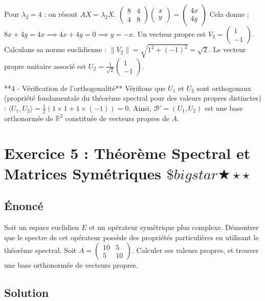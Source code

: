 \documentclass[11pt,a4paper]{article}
\begin{document}
Pour $\lambda_2 = 4$ : on résout $AX = \lambda_2 X$.
$\begin{pmatrix} 8 & 4 \\ 4 & 8 \end{pmatrix} \begin{pmatrix} x \\ y \end{pmatrix} = \begin{pmatrix} 4x \\ 4y \end{pmatrix}$
Cela donne :
$8x + 4y = 4x \implies 4x + 4y = 0 \implies y = -x$.
Un vecteur propre est $V_2 = \begin{pmatrix} 1 \\ -1 \end{pmatrix}$.
Calculons sa norme euclidienne : $\|V_2\| = \sqrt{1^2 + (-1)^2} = \sqrt{2}$.
Le vecteur propre unitaire associé est $U_2 = \frac{1}{\sqrt{2}} \begin{pmatrix} 1 \\ -1 \end{pmatrix}$.

**4 - Vérification de l'orthogonalité**
Vérifions que $U_1$ et $U_2$ sont orthogonaux (propriété fondamentale du théorème spectral pour des valeurs propres distinctes) :
$\langle U_1, U_2 \rangle = \frac{1}{2} (1 \times 1 + 1 \times (-1)) = 0$.
Ainsi, $\mathcal{B}' = (U_1, U_2)$ est une base orthonormée de $\mathbb{R}^2$ constituée de vecteurs propres de $A$.

\newpage
\section{Exercice 5 : Théorème Spectral et Matrices Symétriques \quad $\$bigstar$\bigstar$\bigstar\star\star$}

\subsection{Énoncé}
Soit un espace euclidien $E$ et un opérateur symétrique plus complexe.
Démontrer que le spectre de cet opérateur possède des propriétés particulières en utilisant le théorème spectral.
Soit $A = \begin{pmatrix} 10 & 5 \\ 5 & 10 \end{pmatrix}$.
Calculer ses valeurs propres, et trouver une base orthonormée de vecteurs propres.

\subsection{Solution}
\end{document}
